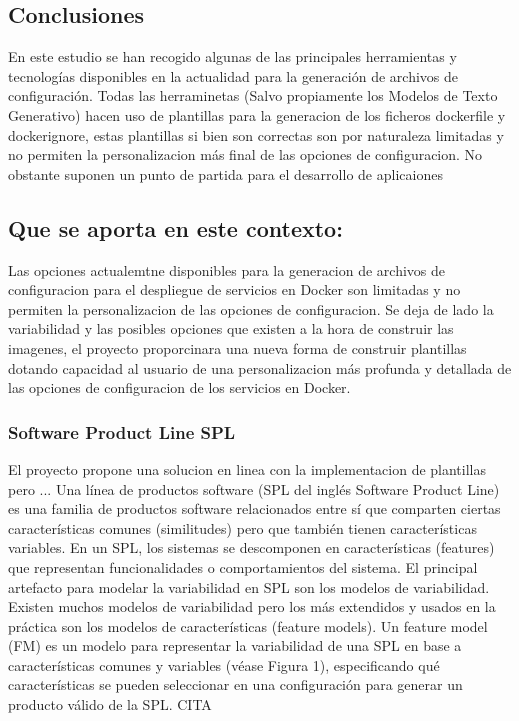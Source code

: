\documentclass[12pt, a4paper, twoside]{article}
\begin{document}
\subsection{Conclusiones}
En este estudio se han recogido algunas de las principales herramientas y tecnologías disponibles en la actualidad para la generación de archivos de configuración.
Todas las herraminetas (Salvo propiamente los Modelos de Texto Generativo) hacen uso de plantillas para la generacion de los ficheros dockerfile y dockerignore, estas plantillas si bien son correctas son por naturaleza limitadas y no permiten la personalizacion más final de las opciones de configuracion.
No obstante suponen un punto de partida para el desarrollo de aplicaiones 

\subsection{Que se aporta en este contexto:}
Las opciones actualemtne disponibles para la generacion de archivos de configuracion para el despliegue de servicios en Docker son limitadas y no permiten la personalizacion de las opciones de configuracion.
Se deja de lado la variabilidad y las posibles opciones que existen a la hora de construir las imagenes, el proyecto proporcinara una nueva forma de construir plantillas dotando capacidad al usuario de una personalizacion
más profunda y detallada de las opciones de configuracion de los servicios en Docker.
\subsubsection{Software Product Line SPL}
El proyecto propone una solucion en linea con la implementacion de plantillas pero ...
Una línea de productos software (SPL del inglés Software Product Line) es una familia de productos software 
relacionados entre sí que comparten ciertas características comunes (similitudes) pero que también tienen 
características variables. En un SPL, los sistemas se descomponen en características (features) que representan 
funcionalidades o comportamientos del sistema. 
El principal artefacto para modelar la variabilidad en SPL son los modelos de variabilidad. Existen muchos modelos 
de variabilidad pero los más extendidos y usados en la práctica son los modelos de características (feature models). 
Un feature model (FM) es un modelo para representar la variabilidad de una SPL en base a características comunes y 
variables (véase Figura 1), especificando qué características se pueden seleccionar en una configuración para generar 
un producto válido de la SPL. CITA 
\end{document}
